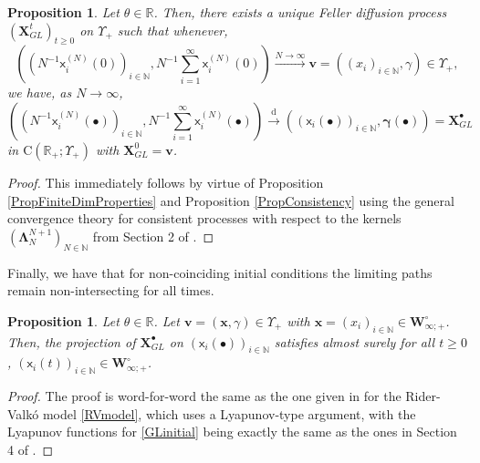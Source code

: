 \documentclass[]{article}
\newtheorem{prop}[thm]{Proposition}
\begin{document}
\begin{prop}\label{PropConvergenceOnPathSpace}
Let $\theta\in \mathbb{R}$. Then, there exists a unique Feller diffusion process $(\mathbf{X}_{GL}^t)_{t\ge 0}$ on $\Upsilon_+$ such that whenever, 
\begin{equation*}
\left((N^{-1}\mathsf{x}_i^{(N)}(0))_{i\in \mathbb{N}},N^{-1}\sum_{i=1}^\infty \mathsf{x}_i^{(N)}(0)\right)  \overset{N \to \infty}{\longrightarrow} \boldsymbol{v}=((x_i)_{i\in \mathbb{N}},\gamma)\in \Upsilon_+,
\end{equation*}
we have, as $N \to \infty$,
\begin{equation*}
\left((N^{-1}\mathsf{x}_i^{(N)}(\bullet))_{i\in \mathbb{N}},N^{-1}\sum_{i=1}^\infty \mathsf{x}_i^{(N)}(\bullet)\right) \overset{\mathrm{d}}{\longrightarrow} \left((\mathsf{x}_i(\bullet))_{i\in \mathbb{N}},\boldsymbol{\gamma}(\bullet)\right)= \mathbf{X}_{GL}^\bullet
\end{equation*}
in $\mathrm{C}(\mathbb{R}_+;\Upsilon_+)$
with $\mathbf{X}_{GL}^0=\boldsymbol{v}$.
\end{prop}

\begin{proof}
This immediately follows by virtue of Proposition \ref{PropFiniteDimProperties} and Proposition \ref{PropConsistency} using the general convergence theory for consistent processes with respect to the kernels $(\boldsymbol{\Lambda}_N^{N+1})_{N\in \mathbb{N}}$ from Section 2 of \cite{AM24}.
\end{proof}

Finally, we have that for non-coinciding initial conditions the limiting paths remain non-intersecting for all times.

\begin{prop}\label{NonCollisionProp}
Let $\theta \in \mathbb{R}$. Let $\boldsymbol{v}=(\mathbf{x},\gamma)\in \Upsilon_+$ with $\mathbf{x}=(x_i)_{i\in \mathbb{N}}\in \mathbf{W}_{\infty;+}^\circ$. Then, the projection of $\mathbf{X}_{GL}^\bullet$ on $(\mathsf{x}_i(\bullet))_{i\in \mathbb{N}}$ satisfies almost surely for all $t\ge 0$, $(\mathsf{x}_i(t))_{i \in \mathbb{N}}\in \mathbf{W}_{\infty;+}^\circ$.
\end{prop}

\begin{proof}
The proof is word-for-word the same as the one given in \cite{AM24} for the Rider-Valk\'{o} model \eqref{RVmodel}, which uses a Lyapunov-type argument, with the Lyapunov functions for \eqref{GLinitial} being exactly the same as the 
ones in Section 4 of \cite{AM24}.
\end{proof}
\end{document}
